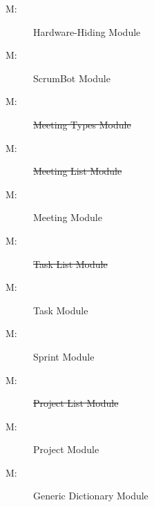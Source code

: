 \documentclass[12pt, titlepage]{article}
\newcounter{mnum}
\newcommand{\mthemnum}{M\themnum}
\begin{document}
\begin{description}
    \item [ \mthemnum \label{m1}:] Hardware-Hiding Module
    \item [ \mthemnum \label{m2}:] ScrumBot Module
    \item [ \mthemnum \label{m3}:] \sout{Meeting Types Module}
    \item [ \mthemnum \label{m4}:] \sout{Meeting List Module}
    \item [ \mthemnum \label{m5}:] Meeting Module
    \item [ \mthemnum \label{m6}:] \sout{Task List Module}
    \item [ \mthemnum \label{m7}:] Task Module
    \item [ \mthemnum \label{m8}:] Sprint Module
    \item [ \mthemnum \label{m9}:] \sout{Project List Module}
    \item [ \mthemnum \label{m10}:] Project Module
    \item [ \mthemnum \label{m11}:] Generic Dictionary Module
\end{description}
\end{document}
